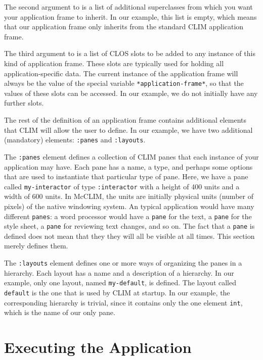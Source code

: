 The second argument to  is a list of
additional superclasses from which you want your application frame to
inherit.  In our example, this list is empty, which means that our
application frame only inherits from the standard CLIM application
frame.

The third argument to  is a list of
CLOS slots to be added to any instance of this kind of application
frame.  These slots are typically used for holding all
application-specific data.  The current instance of the application
frame will always be the value of the special variable
\texttt{*application-frame*}, so that the values of these slots can be
accessed.  In our example, we do not initially have any further slots.

The rest of the definition of an application frame contains additional
elements that CLIM will allow the user to define.  In our example, we
have two additional (mandatory) elements: \texttt{:panes} and
\texttt{:layouts}.

The \texttt{:panes} element defines a collection of CLIM panes that
each instance of your application may have.  Each pane has a name, a
type, and perhaps some options that are used to instantiate that
particular type of pane.  Here, we have a pane called
\texttt{my-interactor} of type \texttt{:interactor} with a height of
400 units and a width of 600 units.  In McCLIM, the units are
initially physical units (number of pixels) of the native windowing
system. An typical application would have many different
\texttt{panes}: a word processor would have a \texttt{pane} for the
text, a \texttt{pane} for the style sheet, a \texttt{pane} for
reviewing text changes, and so on. The fact that a \texttt{pane} is
defined does not mean that they they will all be visible at all
times. This section merely defines them.

The \texttt{:layouts} element defines one or more ways of organizing
the panes in a hierarchy.  Each layout has a name and a description of
a hierarchy.  In our example, only one layout, named
\texttt{my-default}, is defined.  The layout called \texttt{default}
is the one that is used by CLIM at startup.  In our example, the
corresponding hierarchy is trivial, since it contains only the one
element \texttt{int}, which is the name of our only pane.

\section{Executing the Application}

